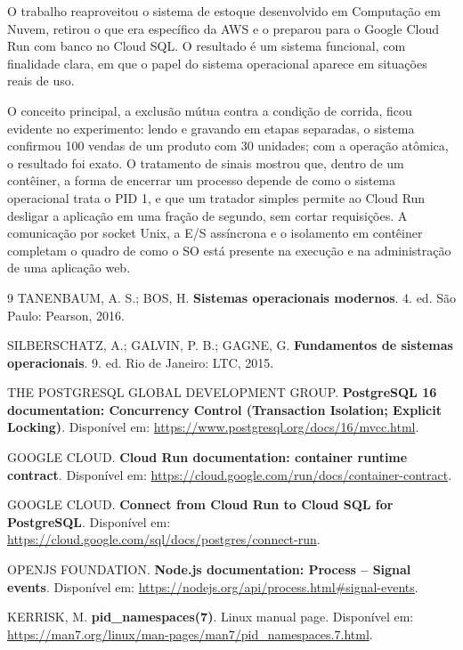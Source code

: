\documentclass[12pt,a4paper]{article}
\begin{document}
O trabalho reaproveitou o sistema de estoque desenvolvido em Computação em Nuvem, retirou o que
era específico da AWS e o preparou para o Google Cloud Run com banco no Cloud SQL. O resultado
é um sistema funcional, com finalidade clara, em que o papel do sistema operacional aparece em
situações reais de uso.

O conceito principal, a exclusão mútua contra a condição de corrida, ficou evidente no
experimento: lendo e gravando em etapas separadas, o sistema confirmou 100 vendas de um produto
com 30 unidades; com a operação atômica, o resultado foi exato. O tratamento de sinais mostrou
que, dentro de um contêiner, a forma de encerrar um processo depende de como o sistema
operacional trata o PID 1, e que um tratador simples permite ao Cloud Run desligar a aplicação
em uma fração de segundo, sem cortar requisições. A comunicação por socket Unix, a E/S
assíncrona e o isolamento em contêiner completam o quadro de como o SO está presente na
execução e na administração de uma aplicação web.

\begin{thebibliography}{9}
TANENBAUM, A. S.; BOS, H. \textbf{Sistemas operacionais modernos}. 4. ed. São Paulo: Pearson,
2016.

SILBERSCHATZ, A.; GALVIN, P. B.; GAGNE, G. \textbf{Fundamentos de sistemas operacionais}.
9. ed. Rio de Janeiro: LTC, 2015.

THE POSTGRESQL GLOBAL DEVELOPMENT GROUP. \textbf{PostgreSQL 16 documentation: Concurrency
Control (Transaction Isolation; Explicit Locking)}. Disponível em:
\url{https://www.postgresql.org/docs/16/mvcc.html}.

GOOGLE CLOUD. \textbf{Cloud Run documentation: container runtime contract}. Disponível em:
\url{https://cloud.google.com/run/docs/container-contract}.

GOOGLE CLOUD. \textbf{Connect from Cloud Run to Cloud SQL for PostgreSQL}. Disponível em:
\url{https://cloud.google.com/sql/docs/postgres/connect-run}.

OPENJS FOUNDATION. \textbf{Node.js documentation: Process -- Signal events}. Disponível em:
\url{https://nodejs.org/api/process.html\#signal-events}.

KERRISK, M. \textbf{pid\_namespaces(7)}. Linux manual page. Disponível em:
\url{https://man7.org/linux/man-pages/man7/pid_namespaces.7.html}.
\end{thebibliography}
\end{document}
